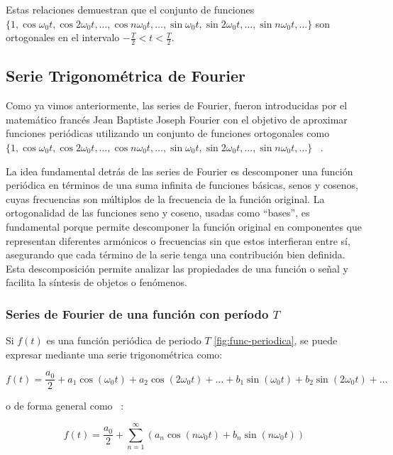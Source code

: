 Estas relaciones demuestran que el conjunto de funciones $\{1, \cos \omega_0 t, \cos 2\omega_0 t, \ldots, \cos n \omega_0 t, \ldots, \sin \omega_0 t, \sin 2\omega_0 t, \ldots, \sin n \omega_0 t, \ldots \}$ son ortogonales en el intervalo $-\frac{T}{2} < t < \frac{T}{2}$.

\subsection{Serie Trigonométrica de Fourier}
Como ya vimos anteriormente, las series de Fourier, fueron introducidas por el matemático francés Jean Baptiste Joseph Fourier con el objetivo de aproximar funciones periódicas utilizando un conjunto de funciones ortogonales como $\{1, \cos \omega_0 t, \cos 2\omega_0 t, \dots, \cos n\omega_0 t, \dots, \sin \omega_0 t, \sin 2\omega_0 t, \dots, \sin n\omega_0 t, \dots\}$ ~\cite{matesAvanzadasZill}.

La idea fundamental detrás de las series de Fourier es descomponer una función periódica en términos de una suma infinita de funciones básicas, senos y cosenos, cuyas frecuencias son múltiplos de la frecuencia de la función original. La ortogonalidad de las funciones seno y coseno, usadas como ``bases'', es fundamental porque permite descomponer la función original en componentes que representan diferentes armónicos o frecuencias sin que estos interfieran entre sí, asegurando que cada término de la serie tenga una contribución bien definida. Esta descomposición permite analizar las propiedades de una función o señal y facilita la síntesis de objetos o fenómenos.

\subsubsection{Series de Fourier de una función con período $T$}

Si $f(t)$ es una función periódica de periodo $T$ \ref{fig:func-periodica}, se puede expresar mediante una serie trigonométrica como:

\begin{equation}\label{eq26}
	f(t) = \frac{a_0}{2} + a_1 \cos(\omega_0 t) + a_2 \cos(2\omega_0 t) + \dots + b_1 \sin(\omega_0 t) + b_2 \sin(2\omega_0 t) + \dots
\end{equation}


o de forma general como ~\cite{fourierHsu}:

\begin{equation}\label{eq27}
f(t) = \frac{a_0}{2} + \sum_{n=1}^{\infty} \left(a_n \cos(n\omega_0 t) + b_n \sin(n\omega_0 t)\right)
\end{equation}

